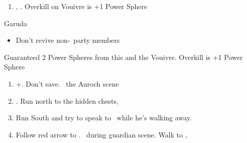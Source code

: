 \begin{enumerate}[resume]
	\item \sd, \skippablefmv. Overkill on Vouivre is +1 Power Sphere
\end{enumerate}
\begin{battle}[1800]{Garuda}
	\begin{itemize}
		\tidusf Haste \auron
		\auronf Attack x3
		\wakkaf Defend, Potion if \tidus\ is less than 312 HP
		\tidusf Attack
		\tidusf Defend
		\wakkaf Defend, Potion if \auron\ is less than 202 HP
		\auronf Attack x3
		\item Don't revive non-\auron\ party members
	\end{itemize}
	Guaranteed 2 Power Spheres from this and the Vouivre. Overkill is +1 Power Sphere
\end{battle}
\begin{enumerate}[resume]
	\item \cs+\skippablefmv[1:30]. Don't save. \sd\ the Auroch scene
	\item \cs[4:50]. Run north to the hidden chests, 
	\item Run South and try to speak to \auron\ while he's walking away.
	\item Follow red arrow to \yuna. \sd\ during guardian scene. Walk to \yuna, \cs[4:20]
\end{enumerate}